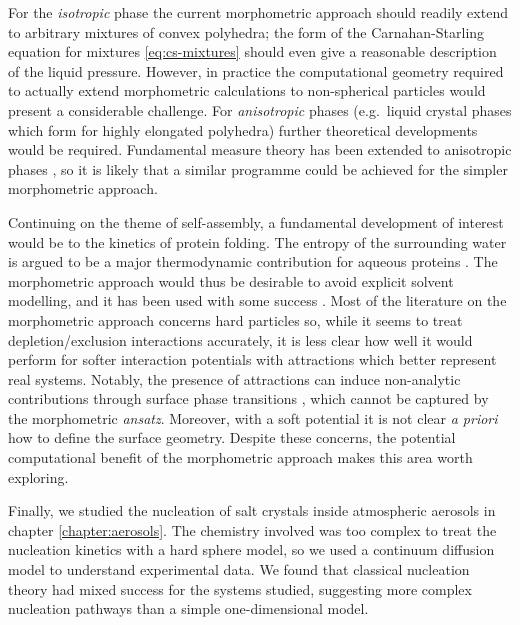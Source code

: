 \documentclass[11pt,twoside]{report}
\begin{document}
For the \emph{isotropic} phase the current morphometric approach should readily extend to arbitrary mixtures of convex polyhedra; the form of the Carnahan-Starling equation for mixtures \eqref{eq:cs-mixtures} should even give a reasonable description of the liquid pressure.
However, in practice the computational geometry required to actually extend morphometric calculations to non-spherical particles would present a considerable challenge.
For \emph{anisotropic} phases (e.g.\ liquid crystal phases which form for highly elongated polyhedra) further theoretical developments would be required.
Fundamental measure theory has been extended to anisotropic phases \cite{Hansen-GoosPRL2009,Hansen-GoosJPCM2010,WittmannEL2015,WittmannPRE2015,WittmannJPCM2016}, so it is likely that a similar programme could be achieved for the simpler morphometric approach.

Continuing on the theme of self-assembly, a fundamental development of interest would be to the kinetics of protein folding.
The entropy of the surrounding water is argued to be a major thermodynamic contribution for aqueous proteins \cite{HaranoCPL2004,HaranoBJ2005,KinoshitaCES2006}.
The morphometric approach would thus be desirable to avoid explicit solvent modelling, and it has been used with some success \cite{HaranoCPL2006,RothPRL2006,KodamaJCP2011}.
Most of the literature on the morphometric approach concerns hard particles so, while it seems to treat depletion/exclusion interactions accurately, it is less clear how well it would perform for softer interaction potentials with attractions which better represent real systems.
Notably, the presence of attractions can induce non-analytic contributions through surface phase transitions \cite{EvansELE2003,EvansJCP2004}, which cannot be captured by the morphometric \emph{ansatz}.
Moreover, with a soft potential it is not clear \emph{a priori} how to define the surface geometry.
Despite these concerns, the potential computational benefit of the morphometric approach makes this area worth exploring.

Finally, we studied the nucleation of salt crystals inside atmospheric aerosols in chapter \ref{chapter:aerosols}.
The chemistry involved was too complex to treat the nucleation kinetics with a hard sphere model, so we used a continuum diffusion model to understand experimental data.
We found that classical nucleation theory had mixed success for the systems studied, suggesting more complex nucleation pathways than a simple one-dimensional model.
\end{document}

